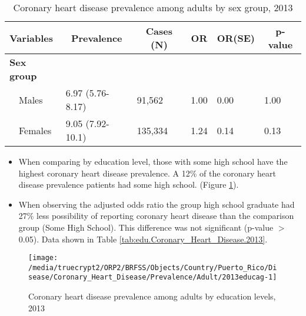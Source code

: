 \begin{table}[H]
\caption{Coronary heart disease prevalence  among adults by sex group, 2013\label{tab:sex.Coronary_Heart_Disease.2013}} 
\begin{center}
\begin{tabular}{llllll}
\hline\hline
\multicolumn{1}{l}{Variables}&\multicolumn{1}{c}{Prevalence}&\multicolumn{1}{c}{Cases (N)}&\multicolumn{1}{c}{OR}&\multicolumn{1}{c}{OR(SE)}&\multicolumn{1}{c}{p-value}\tabularnewline
\hline
{\bfseries Sex group}&&&&&\tabularnewline
~~Males&6.97 (5.76-8.17)& 91,562&1.00&0.00&1.00\tabularnewline
~~Females&9.05 (7.92-10.1)&135,334&1.24&0.14&0.13\tabularnewline
\hline
\end{tabular}\end{center}

\end{table}


\newpage
\begin{itemize}

\item When comparing by education level, those with
some high school
have the highest coronary heart disease prevalence. A 12\% of the coronary heart disease prevalence patients had some high school.
(Figure \ref{fig:edu.Coronary_Heart_Disease.2013}).

\item 
When observing the adjusted odds ratio the group high school graduate had 27\% less possibility of reporting coronary heart disease than the comparison group (Some High School).
This difference was not significant (p-value $>$ 0.05).  Data shown in Table \ref{tab:edu.Coronary_Heart_Disease.2013}.

\end{itemize}

\begin{figure}[H]
\caption{Coronary heart disease prevalence among adults by education levels, 2013}
\begin{knitrout}
\color{fgcolor}

{\centering \texttt{[image: /media/truecrypt2/ORP2/BRFSS/Objects/Country/Puerto\_Rico/Disease/Coronary\_Heart\_Disease/Prevalence/Adult/2013educag-1]} 

}



\end{knitrout}
 \label{fig:edu.Coronary_Heart_Disease.2013}
\end{figure}

